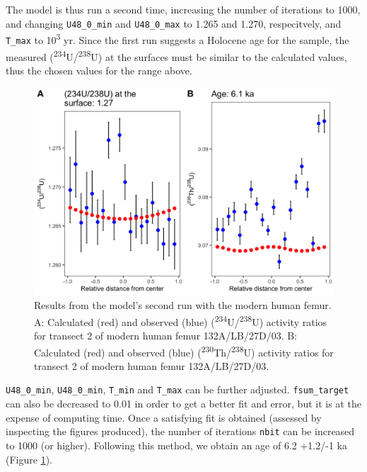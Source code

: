 \documentclass[]{elsarticle} %
\begin{document}
\FloatBarrier

The model is thus run a second time, increasing the number of iterations to 1000, and changing \texttt{U48\_0\_min} and \texttt{U48\_0\_max} to 1.265 and 1.270, respecitvely, and \texttt{T\_max} to 10\textsuperscript{3} yr. Since the first run suggests a Holocene age for the sample, the measured (\textsuperscript{234}U/\textsuperscript{238}U) at the surfaces must be similar to the calculated values, thus the chosen values for the range above.



\begin{figure}
\includegraphics[width=1\linewidth]{figures/plot-panel-second-run-modern} \caption{Results from the model's second run with the modern human femur. A: Calculated (red) and observed (blue) (\textsuperscript{234}U/\textsuperscript{238}U) activity ratios for transect 2 of modern human femur 132A/LB/27D/03. B: Calculated (red) and observed (blue) (\textsuperscript{230}Th/\textsuperscript{238}U) activity ratios for transect 2 of modern human femur 132A/LB/27D/03.}\label{fig:plot-panel-second-run-modern-fig}
\end{figure}

\FloatBarrier

\texttt{U48\_0\_min}, \texttt{U48\_0\_min}, \texttt{T\_min} and \texttt{T\_max} can be further adjusted. \texttt{fsum\_target} can also be decreased to 0.01 in order to get a better fit and error, but it is at the expense of computing time. Once a satisfying fit is obtained (assessed by inspecting the figures produced), the number of iterations \texttt{nbit} can be increased to 1000 (or higher). Following this method, we obtain an age of 6.2 +1.2/-1 ka (Figure \ref{fig:plot-panel-second-run-modern-fig}).
\end{document}
